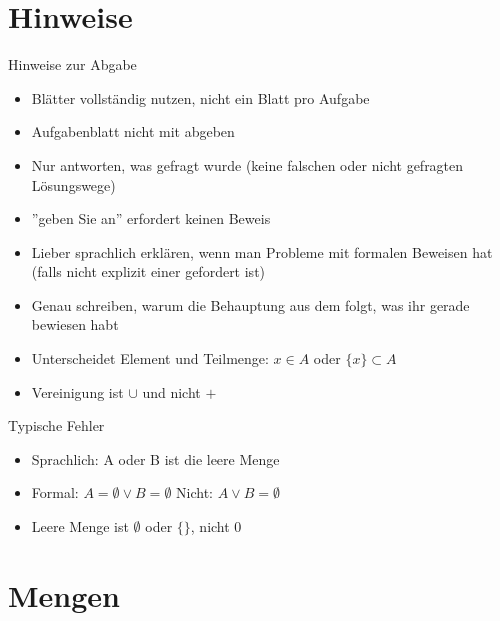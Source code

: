 \documentclass[]{beamer}
\begin{document}

\begin{frame}
	\titlepage
\end{frame}

\section{Hinweise}

\begin{frame}{Hinweise zur Abgabe}
	\begin{itemize}
		\item Blätter vollständig nutzen, nicht ein Blatt pro Aufgabe
		\item Aufgabenblatt nicht mit abgeben
		\item Nur antworten, was gefragt wurde (keine falschen oder nicht gefragten Lösungswege)
		\item ''geben Sie an'' erfordert keinen Beweis
		\item Lieber sprachlich erklären, wenn man Probleme mit formalen Beweisen hat (falls nicht explizit einer gefordert ist)
		\item Genau schreiben, warum die Behauptung aus dem folgt, was ihr gerade bewiesen habt
		\item Unterscheidet Element und Teilmenge: $x \in A$ oder $\{x\} \subset A$
		\item Vereinigung ist $\cup$ und nicht $+$
	\end{itemize}
\end{frame}

\begin{frame}{Typische Fehler}
	\begin{itemize}
		\item Sprachlich: A oder B ist die leere Menge
		\item Formal: $A = \emptyset \lor B = \emptyset$ Nicht: $A \lor B = \emptyset$
		\item Leere Menge ist $\emptyset $ oder $\{\}$, nicht 0
	\end{itemize}
\end{frame}

\section{Mengen}
\end{document}
